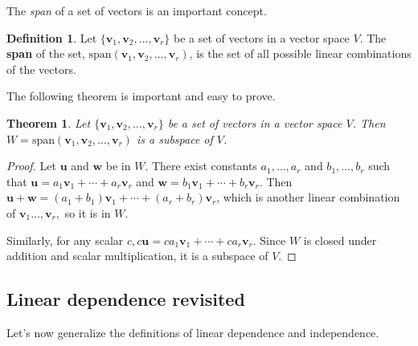 \documentclass[
]{book}
\newtheorem{theorem}{Theorem}[chapter]
\theoremstyle{definition}
\newtheorem{definition}{Definition}[chapter]
\theoremstyle{definition}
\theoremstyle{definition}
\theoremstyle{definition}
\theoremstyle{remark}
\begin{document}
The \emph{span} of a set of vectors is an important concept.

\begin{defbox}

\begin{definition}
\protect\hypertarget{def:span}{}\label{def:span}Let \(\{\mathbf{v}_1,\mathbf{v}_2,\dots,\mathbf{v}_r\}\) be a set of vectors in a vector space \(V\). The \textbf{span} of the set,
\(\text{span}(\mathbf{v}_1,\mathbf{v}_2,\dots,\mathbf{v}_r)\),
is the set of all possible linear combinations of the vectors.
\end{definition}

\end{defbox}

The following theorem is important and easy to prove.

\begin{theorembox}

\begin{theorem}
Let \(\{\mathbf{v}_1,\mathbf{v}_2,\dots,\mathbf{v}_r\}\) be a set of vectors in a vector space \(V\). Then \(W=\textrm{span}(\mathbf{v}_1,\mathbf{v}_2,\dots,\mathbf{v}_r)\) is a subspace of \(V\).
\end{theorem}

\end{theorembox}

\begin{proof}
Let \(\mathbf{u}\) and \(\mathbf{w}\) be in \(W\). There exist constants \(a_1,\dots,a_r\) and \(b_1,\dots,b_r\) such that \(\mathbf{u}=a_1\mathbf{v}_1+\cdots + a_r\mathbf{v}_r\) and \(\mathbf{w}=b_1\mathbf{v}_1+\cdots + b_r\mathbf{v}_r.\) Then \(\mathbf{u}+\mathbf{w}=(a_1+b_1)\mathbf{v}_1+\cdots+(a_r+b_r)\mathbf{v}_r\), which is another linear combination of \(\mathbf{v}_1\dots,\mathbf{v}_r,\) so it is in \(W\).

Similarly, for any scalar \(c,c\mathbf{u}=ca_1\mathbf{v}_1+\cdots+ca_r\mathbf{v}_r.\) Since \(W\) is closed under addition and scalar multiplication, it is a subspace of \(V\).
\end{proof}

\subsection*{Linear dependence revisited}\label{linear-dependence-revisited}

Let's now generalize the definitions of linear dependence and independence.
\end{document}

